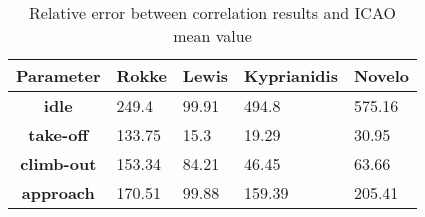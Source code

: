 \begin{table}[h!]
  \centering
  \begin{tabularx}{\textwidth}{||c|X|X|X|X||}
  \hline
    \cellcolor{gray!20}\textbf{Parameter} & \cellcolor{gray!20}\textbf{Rokke} & \cellcolor{gray!20}\textbf{Lewis} & \cellcolor{gray!20}\textbf{Kyprianidis} & \cellcolor{gray!20}\textbf{Novelo} \\ [0.5ex]
  \hline\hline
\centering
    \cellcolor{gray!20}\textbf{idle} & 249.4 & 99.91 & 494.8 & 575.16 \\
  \hline
    \cellcolor{gray!20}\textbf{take-off} & 133.75 & 15.3 & 19.29 & 30.95 \\
  \hline
    \cellcolor{gray!20}\textbf{climb-out} & 153.34 & 84.21 & 46.45 & 63.66 \\
  \hline
    \cellcolor{gray!20}\textbf{approach} & 170.51 & 99.88 & 159.39 & 205.41 \\
  \hline
  \end{tabularx}
  \caption{Relative error between correlation results and ICAO mean value}
  \label{tab:relec}
\end{table}
